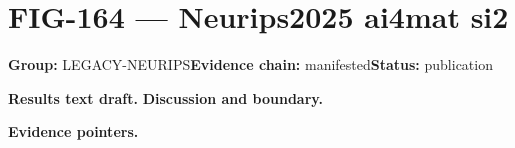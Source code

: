 \clearpage
\section{FIG-164 --- Neurips2025 ai4mat si2}
\label{figpage:fig-164}
\textbf{Group:} LEGACY-NEURIPS\quad \textbf{Evidence chain:} manifested\quad \textbf{Status:} publication

\textbf{Results text draft.} 
\textbf{Discussion and boundary.} 


\textbf{Evidence pointers.}



\vfill
